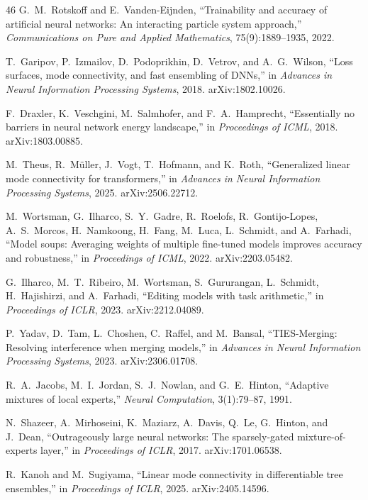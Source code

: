 \documentclass[11pt]{article}
\begin{document}
\begin{thebibliography}{46}
G.~M.~Rotskoff and E.~Vanden-Eijnden,
``Trainability and accuracy of artificial neural networks: An interacting
particle system approach,'' \emph{Communications on Pure and Applied
Mathematics}, 75(9):1889--1935, 2022.

T.~Garipov, P.~Izmailov, D.~Podoprikhin, D.~Vetrov, and A.~G.~Wilson,
``Loss surfaces, mode connectivity, and fast ensembling of {DNN}s,''
in \emph{Advances in Neural Information Processing Systems}, 2018.
arXiv:1802.10026.

F.~Draxler, K.~Veschgini, M.~Salmhofer, and F.~A.~Hamprecht,
``Essentially no barriers in neural network energy landscape,''
in \emph{Proceedings of ICML}, 2018.
arXiv:1803.00885.

M.~Theus, R.~M\"{u}ller, J.~Vogt, T.~Hofmann, and K.~Roth,
``Generalized linear mode connectivity for transformers,''
in \emph{Advances in Neural Information Processing Systems}, 2025.
arXiv:2506.22712.

M.~Wortsman, G.~Ilharco, S.~Y.~Gadre, R.~Roelofs, R.~Gontijo-Lopes,
A.~S.~Morcos, H.~Namkoong, H.~Fang, M.~Luca, L.~Schmidt, and
A.~Farhadi,
``Model soups: Averaging weights of multiple fine-tuned models improves
accuracy and robustness,''
in \emph{Proceedings of ICML}, 2022.
arXiv:2203.05482.

G.~Ilharco, M.~T.~Ribeiro, M.~Wortsman, S.~Gururangan, L.~Schmidt,
H.~Hajishirzi, and A.~Farhadi,
``Editing models with task arithmetic,''
in \emph{Proceedings of ICLR}, 2023.
arXiv:2212.04089.

P.~Yadav, D.~Tam, L.~Choshen, C.~Raffel, and M.~Bansal,
``{TIES}-Merging: Resolving interference when merging models,''
in \emph{Advances in Neural Information Processing Systems}, 2023.
arXiv:2306.01708.

R.~A.~Jacobs, M.~I.~Jordan, S.~J.~Nowlan, and G.~E.~Hinton,
``Adaptive mixtures of local experts,''
\emph{Neural Computation}, 3(1):79--87, 1991.

N.~Shazeer, A.~Mirhoseini, K.~Maziarz, A.~Davis, Q.~Le, G.~Hinton,
and J.~Dean,
``Outrageously large neural networks: The sparsely-gated
mixture-of-experts layer,''
in \emph{Proceedings of ICLR}, 2017.
arXiv:1701.06538.

R.~Kanoh and M.~Sugiyama,
``Linear mode connectivity in differentiable tree ensembles,''
in \emph{Proceedings of ICLR}, 2025.
arXiv:2405.14596.


\end{thebibliography}
\end{document}
